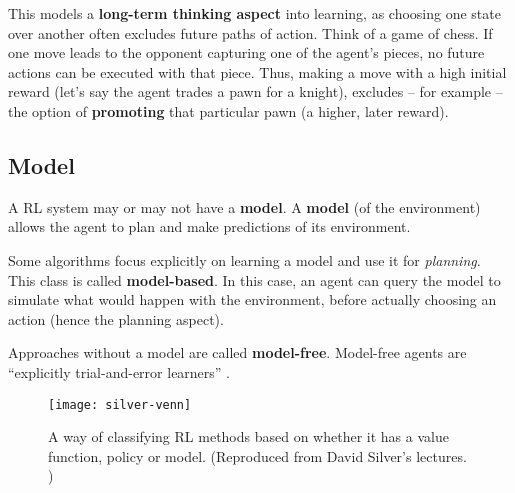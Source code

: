 This models a \textbf{long-term thinking aspect} into learning, as choosing one state over another often excludes future paths of action.
Think of a game of chess. If one move leads to the opponent capturing one of the agent's pieces, no future actions can be executed with that piece.
Thus, making a move with a high initial reward (let’s say the agent trades a pawn for a knight), excludes -- for example -- the option of \textbf{promoting} that particular pawn (a higher, later reward).

\subsection{Model}
A RL system may or may not have a \textbf{model}.
A \textbf{model} (of the environment) allows the agent to plan and make predictions of its environment.

Some algorithms focus explicitly on learning a model and use it for \emph{planning}.
This class is called \textbf{model-based}.
In this case, an agent can query the model to simulate what would happen with the environment, before actually choosing an action (hence the planning aspect).

Approaches without a model are called \textbf{model-free}. Model-free agents are ``explicitly trial-and-error learners'' \cite{rlai}.

\begin{figure}[h]
    \caption{A way of classifying RL methods based on whether it has a value function, policy or model. (Reproduced from David Silver's lectures. \cite{silver-lectures})}
    \vspace*{0.2cm}
    \centering
    \texttt{[image: silver-venn]}
\end{figure}

